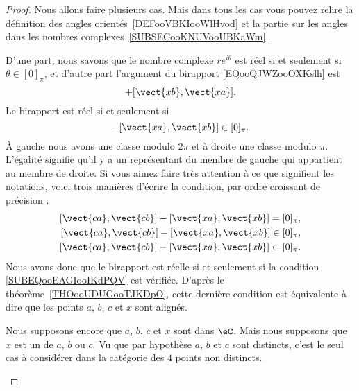 \begin{proof}
	Nous allons faire plusieurs cas. Mais dans tous les cas vous pouvez relire la définition des angles orientés~\ref{DEFooVBKIooWlHvod} et la partie sur les angles dans les nombres complexes~\ref{SUBSECooKNUVooUBKaWm}.
	\begin{subproof}

		D'une part, nous savons que le nombre complexe \( r e^{i\theta}\) est réel si et seulement si \( \theta\in[0]_{\pi}\), et d'autre part l'argument du birapport \eqref{EQooQJWZooOXKslh} est
		\begin{equation}
			[\vect{ ca },\vect{ cb }]+[\vect{ xb },\vect{ xa }].
		\end{equation}
		Le birapport est réel si et seulement si
		\begin{equation}
			[\vect{ ca },\vect{ cb }]-[\vect{ xa },\vect{ xb }]\in[0]_{\pi}.
		\end{equation}
		À gauche nous avons une classe modulo \( 2\pi\) et à droite une classe modulo \( \pi\). L'égalité signifie qu'il y a un représentant du membre de gauche qui appartient au membre de droite. Si vous aimez faire très attention à ce que signifient les notations, voici trois manières d'écrire la condition, par ordre croissant de précision :
		\begin{subequations}
			\begin{align}
				[\vect{ ca },\vect{ cb }]-[\vect{ xa },\vect{ xb }]=[0]_{\pi},   \\
				[\vect{ ca },\vect{ cb }]-[\vect{ xa },\vect{ xb }]\in[0]_{\pi}, \\
				[\vect{ ca },\vect{ cb }]-[\vect{ xa },\vect{ xb }]\subset[0]_{\pi}.        \label{SUBEQooEAGIooIKdPQV}
			\end{align}
		\end{subequations}
		Nous avons donc que le birapport est réelle si et seulement si la condition \eqref{SUBEQooEAGIooIKdPQV} est vérifiée. D'après le théorème~\ref{THOooUDUGooTJKDpO}, cette dernière condition est équivalente à dire que les points \( a\), \( b\), \( c\) et \( x\) sont alignés.


		Nous supposons encore que \( a\), \( b\), \( c\) et \( x\) sont dans \( \eC\). Mais nous supposons que \( x\) est un de \( a\), \( b\) ou \( c\). Vu que par hypothèse \( a\), \( b\) et \( c\) sont distincts, c'est le seul cas à considérer dans la catégorie des \( 4\) points non distincts.


\end{subproof}
\end{proof}
